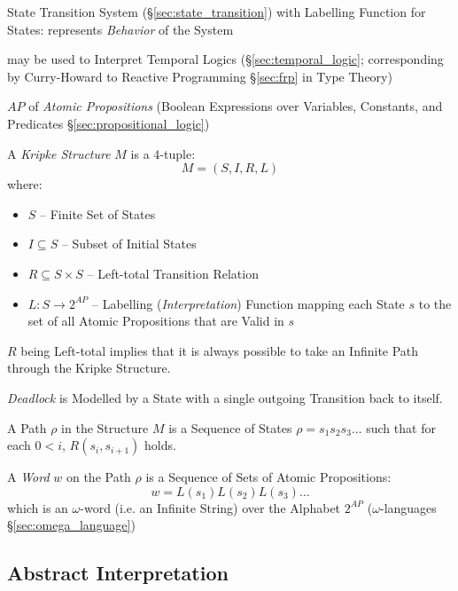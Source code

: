 State Transition System (\S\ref{sec:state_transition}) with Labelling
Function for States: represents \emph{Behavior} of the System


may be used to Interpret Temporal Logics (\S\ref{sec:temporal_logic};
corresponding by Curry-Howard to Reactive Programming \S\ref{sec:frp}
in Type Theory)


$AP$ of \emph{Atomic Propositions} (Boolean
Expressions over Variables, Constants, and Predicates
\S\ref{sec:propositional_logic})

A \emph{Kripke Structure} $M$ is a $4$-tuple:
\[
  M = (S, I, R, L)
\]
where:
\begin{itemize}
  \item $S$ -- Finite Set of States
  \item $I \subseteq S$ -- Subset of Initial States
  \item $R \subseteq S \times S$ -- Left-total Transition Relation
  \item $L : S \rightarrow 2^{AP}$ -- Labelling
    (\emph{Interpretation}) Function mapping each State $s$ to the set
    of all Atomic Propositions that are Valid in $s$
\end{itemize}
$R$ being Left-total implies that it is always possible to take an
Infinite Path through the Kripke Structure.

\emph{Deadlock} is Modelled by a State with a single outgoing
Transition back to itself.

A Path $\rho$ in the Structure $M$ is a Sequence of States $\rho =
s_1s_2s_3\ldots$ such that for each $0 < i$, $R(s_i, s_{i+1})$ holds.

A \emph{Word} $w$ on the Path $\rho$ is a Sequence of Sets of Atomic
Propositions:
\[
  w = L(s_1)L(s_2)L(s_3)\ldots
\]
which is an $\omega$-word (i.e. an Infinite String) over the Alphabet
$2^{AP}$ (\fist $\omega$-languages \S\ref{sec:omega_language})



\subsection{Abstract Interpretation}\label{sec:abstract_interpretation}

